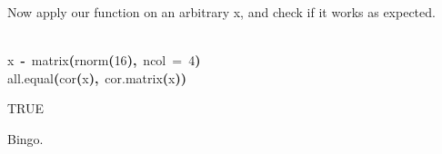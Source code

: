 \documentclass{article}
\newcommand{\hlnumber}[1]{\textcolor[rgb]{0.0823529411764706,0.0784313725490196,0.709803921568627}{#1}}%
\newcommand{\hlfunctioncall}[1]{\textcolor[rgb]{1,0,0}{#1}}%
\newcommand{\hlkeyword}[1]{\textcolor[rgb]{0,0,0}{\textbf{#1}}}%
\newcommand{\hlargument}[1]{\textcolor[rgb]{0.694117647058824,0.247058823529412,0.0196078431372549}{#1}}%
\newcommand{\hlassignement}[1]{\textcolor[rgb]{0.215686274509804,0.215686274509804,0.384313725490196}{\textbf{#1}}}%
\newcommand{\hlsymbol}[1]{\textcolor[rgb]{0,0,0}{#1}}%
\newcommand{\hlprompt}[1]{\textcolor[rgb]{0,0,0}{#1}}%
\newcommand{\hlstd}[1]{\textcolor[rgb]{0,0,0}{#1}}%
\newenvironment{Houtput}{\raggedright}{%
%
}
\begin{document}
    Now apply our function on an arbitrary x, and check if it works as expected.
\begin{Houtput}
\hspace*{\fill}\\
\hlstd{}\ttfamily\noindent
\hlprompt{\usebox{\hlnormalsizeboxgreaterthan}{\ }}\hlsymbol{x}{\ }\hlassignement{\usebox{\hlnormalsizeboxlessthan}-}{\ }\hlfunctioncall{matrix}\hlkeyword{(}\hlfunctioncall{rnorm}\hlkeyword{(}\hlnumber{16}\hlkeyword{)}\hlkeyword{,}{\ }\hlargument{ncol}{\ }\hlargument{=}{\ }\hlnumber{4}\hlkeyword{)}\mbox{}
\normalfont
\hspace*{\fill}\\
\hlstd{}\ttfamily\noindent
\hlprompt{\usebox{\hlnormalsizeboxgreaterthan}{\ }}\hlfunctioncall{all.equal}\hlkeyword{(}\hlfunctioncall{cor}\hlkeyword{(}\hlsymbol{x}\hlkeyword{)}\hlkeyword{,}{\ }\hlfunctioncall{cor.matrix}\hlkeyword{(}\hlsymbol{x}\hlkeyword{)}\hlkeyword{)}\mbox{}
\normalfont
\hspace*{\fill}\\
\hlstd{}\begin{Schunk}
\begin{Soutput}
[1] TRUE
\end{Soutput}

\end{Schunk}
\end{Houtput}

    Bingo.
\end{document}
